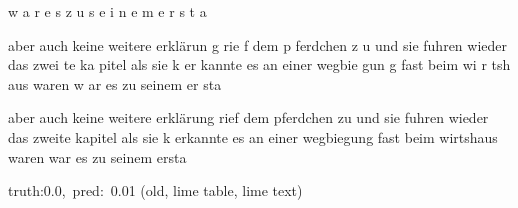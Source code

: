 \documentclass[a4paper,10pt,twoside]{article}
\begin{document}
{\color[rgb]{0.0,0,0} w}{\color[rgb]{0.0,0,0} a}{\color[rgb]{0.0,0,0} r} {\color[rgb]{0.0,0,0} e}{\color[rgb]{0.0,0,0} s} {\color[rgb]{0.0,0,0} z}{\color[rgb]{0.0,0,0} u} {\color[rgb]{0.0,0,0} s}{\color[rgb]{0.0,0,0} e}{\color[rgb]{0.0,0,0} i}{\color[rgb]{0.0,0,0} n}{\color[rgb]{0.0,0,0} e}{\color[rgb]{0.0,0,0} m} {\color[rgb]{0.0,0,0} e}{\color[rgb]{0.0,0,0} r}{\color[rgb]{0.0,0,0} s}{\color[rgb]{0.0,0,0} t}{\color[rgb]{0.0,0,0} a}

aber {\color[rgb]{1,0,0} a}uch keine weitere erklärun{\color[rgb]{0,0,1} g}  rie{\color[rgb]{0,0,1} f} dem p{\color[rgb]{0,0,1} f}erdchen z{\color[rgb]{1,0,0} u}  und sie fuhren wieder     das zwei{\color[rgb]{1,0,0} t}e {\color[rgb]{0,0,1} k}a{\color[rgb]{1,0,0} p}itel  als {\color[rgb]{0,0,1} s}ie   k  er{\color[rgb]{1,0,0} k}annte es an einer wegbie{\color[rgb]{1,0,0} g}un{\color[rgb]{1,0,0} g}   fast beim wi{\color[rgb]{0,0,1} r}{\color[rgb]{1,0,0} t}sh{\color[rgb]{1,0,0} a}us {\color[rgb]{0,0,1} w}aren  {\color[rgb]{0,0,1} w}{\color[rgb]{1,0,0} a}r es {\color[rgb]{1,0,0} z}u seinem er{\color[rgb]{0,0,1} s}ta

 aber auch {\color[rgb]{0,0,1} keine} {\color[rgb]{0,0,1} weitere} {\color[rgb]{0,0,1} erklärung} rief {\color[rgb]{0,0,1} dem} pferdchen zu und sie fuhren wieder das zweite kapitel als sie k erkannte es an {\color[rgb]{0,0,1} einer} wegbiegung fast beim wirtshaus waren war es zu seinem ersta

 {\footnotesize {\color[rgb]{0.6, 0.6, 0.6}truth:0.0,~pred:~0.01}} (old, lime table, lime text)\hrulefill
\end{document}
